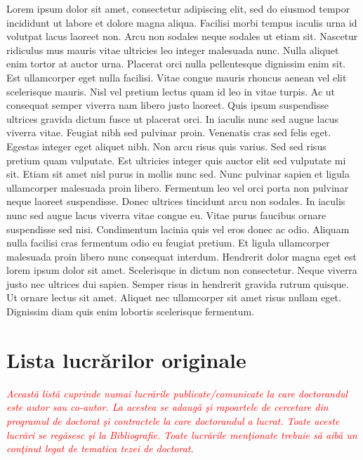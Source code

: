 Lorem ipsum dolor sit amet, consectetur adipiscing elit, sed do eiusmod tempor incididunt ut labore et dolore magna aliqua. Facilisi morbi tempus iaculis urna id volutpat lacus laoreet non. Arcu non sodales neque sodales ut etiam sit. Nascetur ridiculus mus mauris vitae ultricies leo integer malesuada nunc. Nulla aliquet enim tortor at auctor urna. Placerat orci nulla pellentesque dignissim enim sit. Est ullamcorper eget nulla facilisi. Vitae congue mauris rhoncus aenean vel elit scelerisque mauris. Nisl vel pretium lectus quam id leo in vitae turpis. Ac ut consequat semper viverra nam libero justo laoreet. Quis ipsum suspendisse ultrices gravida dictum fusce ut placerat orci. In iaculis nunc sed augue lacus viverra vitae. Feugiat nibh sed pulvinar proin. Venenatis cras sed felis eget. Egestas integer eget aliquet nibh. Non arcu risus quis varius. Sed sed risus pretium quam vulputate.
Est ultricies integer quis auctor elit sed vulputate mi sit. Etiam sit amet nisl purus in mollis nunc sed. Nunc pulvinar sapien et ligula ullamcorper malesuada proin libero. Fermentum leo vel orci porta non pulvinar neque laoreet suspendisse. Donec ultrices tincidunt arcu non sodales. In iaculis nunc sed augue lacus viverra vitae congue eu. Vitae purus faucibus ornare suspendisse sed nisi. Condimentum lacinia quis vel eros donec ac odio. Aliquam nulla facilisi cras fermentum odio eu feugiat pretium. Et ligula ullamcorper malesuada proin libero nunc consequat interdum. Hendrerit dolor magna eget est lorem ipsum dolor sit amet. Scelerisque in dictum non consectetur. Neque viverra justo nec ultrices dui sapien. Semper risus in hendrerit gravida rutrum quisque. Ut ornare lectus sit amet. Aliquet nec ullamcorper sit amet risus nullam eget. Dignissim diam quis enim lobortis scelerisque fermentum.
 

\section{Lista lucr\u{a}rilor originale}
\textcolor{red}{\emph{Această listă cuprinde numai lucrările publicate/comunicate la care doctorandul este autor sau co-autor. La acestea se adaugă şi rapoartele de cercetare din programul de doctorat şi contractele la care doctorandul a lucrat. Toate aceste lucrări se regăsesc şi la Bibliografie. Toate lucrările menţionate trebuie să aibă un conţinut legat de tematica tezei de doctorat.}}

